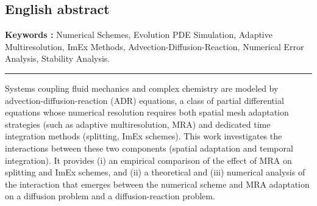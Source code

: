 \subsection*{English abstract}
    \textbf{Keywords  :} Numerical Schemes, Evolution PDE Simulation, Adaptive Multiresolution, ImEx Methods,
    Advection-Diffusion-Reaction, Numerical Error Analysis, Stability Analysis.\par
    \noindent\rule{\textwidth}{0.4pt}
    Systems coupling fluid mechanics and complex chemistry are modeled by advection-diffusion-reaction (ADR) equations, 
    a class of partial differential equations whose numerical resolution requires both spatial mesh adaptation strategies 
    (such as adaptive multiresolution, MRA) and dedicated time integration methods (splitting, ImEx schemes).
    This work investigates the interactions between these two components (spatial adaptation and temporal integration).
    It provides (i) an empirical comparison of the effect of MRA on splitting and ImEx schemes, 
    and (ii) a theoretical and (iii) numerical analysis of the interaction that emerges between the numerical scheme and MRA adaptation on a diffusion problem and a diffusion-reaction problem.
\newpage